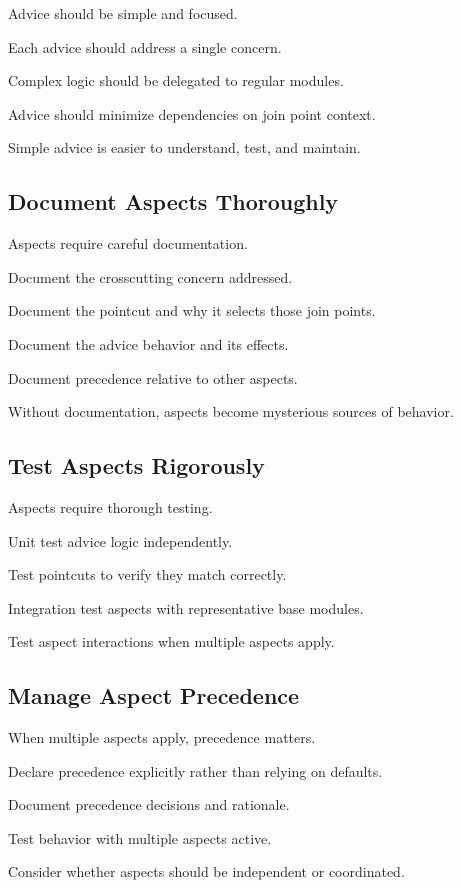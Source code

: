 \documentclass[11pt]{article}
\begin{document}
Advice should be simple and focused.

Each advice should address a single concern.

Complex logic should be delegated to regular modules.

Advice should minimize dependencies on join point context.

Simple advice is easier to understand, test, and maintain.

\subsection{Document Aspects Thoroughly}

Aspects require careful documentation.

Document the crosscutting concern addressed.

Document the pointcut and why it selects those join points.

Document the advice behavior and its effects.

Document precedence relative to other aspects.

Without documentation, aspects become mysterious sources of behavior.

\subsection{Test Aspects Rigorously}

Aspects require thorough testing.

Unit test advice logic independently.

Test pointcuts to verify they match correctly.

Integration test aspects with representative base modules.

Test aspect interactions when multiple aspects apply.

\subsection{Manage Aspect Precedence}

When multiple aspects apply, precedence matters.

Declare precedence explicitly rather than relying on defaults.

Document precedence decisions and rationale.

Test behavior with multiple aspects active.

Consider whether aspects should be independent or coordinated.
\end{document}
